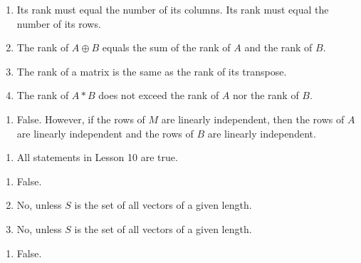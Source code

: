 \documentclass{article}
\begin{document}
\begin{enumerate}
  \item[802:] Its rank must equal the number of its columns. Its rank must equal the number of its rows.
  \item[811:] The rank of $A \oplus B$ equals the sum of the rank of $A$ and the rank of $B$.
  \item[812:] The rank of a matrix is the same as the rank of its transpose.
  \item[813:] The rank of $A*B$ does not exceed the rank of $A$ nor the rank of $B$.
\end{enumerate}
\vspace{0.5cm}

\begin{enumerate}
  \item[902:] False. However, if the rows of $M$ are linearly independent, then the rows of $A$ are linearly independent and the rows of $B$ are linearly independent.
\end{enumerate}
\vspace{0.5cm}

\begin{enumerate}
  \item[] All statements in Lesson 10 are true.
\end{enumerate}
\vspace{0.5cm}

\begin{enumerate}
  \item[1103:] False.
  \item[1109:] No, unless $S$ is the set of all vectors of a given length.
  \item[1110:] No, unless $S$ is the set of all vectors of a given length.
\end{enumerate}
\vspace{0.5cm}

\begin{enumerate}
  \item[1204:] False.
\end{enumerate}
\vspace{0.5cm}
\end{document}
